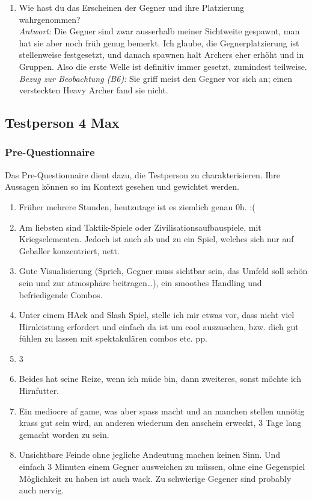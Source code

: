 \documentclass[../Main.tex]{subfiles}
\begin{document}
\begin{enumerate}[label=\textbf{I\arabic*}, leftmargin=1.5cm, itemsep=1em]
\item Wie hast du das Erscheinen der Gegner und ihre Platzierung wahrgenommen? \\
\textit{Antwort:} Die Gegner sind zwar ausserhalb meiner Sichtweite gespawnt, man hat sie aber noch früh genug bemerkt. Ich glaube, die Gegnerplatzierung ist stellenweise festgesetzt, und danach spawnen halt Archers eher erhöht und in Gruppen. Also die erste Welle ist definitiv immer gesetzt, zumindest teilweise. \\
\textit{Bezug zur Beobachtung (B6):} Sie griff meist den Gegner vor sich an; einen versteckten Heavy Archer fand sie nicht.
\end{enumerate}

\subsection{Testperson 4 Max}
\subsubsection{Pre-Questionnaire}

Das Pre-Questionnaire dient dazu, die Testperson zu charakterisieren. Ihre Aussagen können so im Kontext gesehen und gewichtet werden.

\begin{enumerate}[label=\textbf{P\arabic*}, leftmargin=1.5cm, itemsep=0.5em]
\item Früher mehrere Stunden, heutzutage ist es ziemlich genau 0h. :(
\item Am liebsten sind Taktik-Spiele oder Zivilisationsaufbauspiele, mit Kriegselementen. Jedoch ist auch ab und zu ein Spiel, welches sich nur auf Geballer konzentriert, nett.
\item Gute Visualisierung (Sprich, Gegner muss sichtbar sein, das Umfeld soll schön sein und zur atmosphäre beitragen…), ein smoothes Handling und befriedigende Combos.
\item Unter einem HAck and Slash Spiel, stelle ich mir etwas vor, dass nicht viel Hirnleistung erfordert und einfach da ist um cool auszusehen, bzw. dich gut fühlen zu lassen mit spektakulären combos etc. pp.
\item 3
\item Beides hat seine Reize, wenn ich müde bin, dann zweiteres, sonst möchte ich Hirnfutter.
\item Ein mediocre af game, was aber spass macht und an manchen stellen unnötig krass gut sein wird, an anderen wiederum den anschein erweckt, 3 Tage lang gemacht worden zu sein.
\item Unsichtbare Feinde ohne jegliche Andeutung machen keinen Sinn. Und einfach 3 Minuten einem Gegner ausweichen zu müssen, ohne eine Gegenspiel Möglichkeit zu haben ist auch wack. Zu schwierige Gegener sind probably auch nervig.
\end{enumerate}
\end{document}
